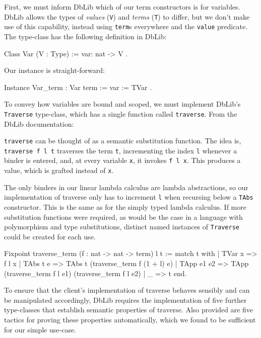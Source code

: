 \documentclass[]{unswthesis}
\let\c\texttt
\let\i\textit
\begin{document}
First, we must inform DbLib which of our term constructors is for variables. DbLib allows the types of \i{values} (\c{V}) and \i{terms} (\c{T}) to differ, but we don't make use of this capability, instead using \c{term}s everywhere and the \c{value} predicate. The type-class has the following definition in DbLib:

\begin{coqcode}
Class Var (V : Type) := {
  var: nat -> V
}.
\end{coqcode}

Our instance is straight-forward:

\begin{coqcode}
Instance Var_term : Var term := {
  var := TVar
}.
\end{coqcode}

To convey how variables are bound and scoped, we must implement DbLib's \c{Traverse} type-class, which has a single function called \c{traverse}. From the DbLib documentation:

\begin{displayquote}
\c{traverse} can be thought of as a semantic substitution function. The idea is, \c{traverse f l t} traverses the term \c{t}, incrementing the index \c{l} whenever a binder is entered, and, at every variable \c{x}, it invokes \c{f l x}. This produces a value, which is grafted instead of \c{x}.
\end{displayquote}

The only binders in our linear lambda calculus are lambda abstractions, so our implementation of traverse only has to increment \c{l} when recursing below a \c{TAbs} constructor. This is the same as for the simply typed lambda calculus. If more substitution functions were required, as would be the case in a language with polymorphism and type substitutions, distinct named instances of \c{Traverse} could be created for each use.

\begin{coqcode}
Fixpoint traverse_term (f : nat -> nat -> term) l t :=
  match t with
  | TVar x =>
      f l x
  | TAbs t e =>
      TAbs t (traverse_term f (1 + l) e)
  | TApp e1 e2 =>
      TApp (traverse_term f l e1) (traverse_term f l e2)
  | _ => t
  end.
\end{coqcode}

To ensure that the client's implementation of traverse behaves sensibly and can be manipulated accordingly, DbLib requires the implementation of five further type-classes that establish semantic properties of traverse. Also provided are five tactics for proving these properties automatically, which we found to be sufficient for our simple use-case.
\end{document}
